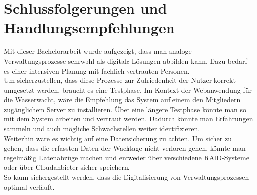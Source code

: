 \documentclass[fontsize=12pt,openright,oneside,paper=a4,BCOR=1cm]{scrbook}
\begin{document}
\section{Schlussfolgerungen und Handlungsempfehlungen}
Mit dieser Bachelorarbeit wurde aufgezeigt, dass man analoge Verwaltungsprozesse sehrwohl als digitale Lösungen abbilden kann. Dazu bedarf es einer intensiven Planung mit fachlich vertrauten Personen.\\ 
Um sicherzustellen, dass diese Prozesse zur Zufriedenheit der Nutzer korrekt umgesetzt werden, braucht es eine Testphase. Im Kontext der Webanwendung für die Wasserwacht, wäre die Empfehlung das System auf einem den Mitgliedern zugänglichem Server zu installieren. Über eine längere Testphase könnte man so mit dem System arbeiten und vertraut werden. Dadurch könnte man Erfahrungen sammeln und auch mögliche Schwachstellen weiter identifizieren.\\ 
Weiterhin wäre es wichtig auf eine Datensicherung zu achten. Um sicher zu gehen, dass die erfassten Daten der Wachtage nicht verloren gehen, könnte man regelmäßig Datenabzüge machen und entweder über verschiedene RAID-Systeme oder über Cloudanbieter sicher speichern. \\ 
So kann sichergestellt werden, dass die Digitalisierung von Verwaltungsprozessen optimal verläuft.


%
%

\newpage
\end{document}

